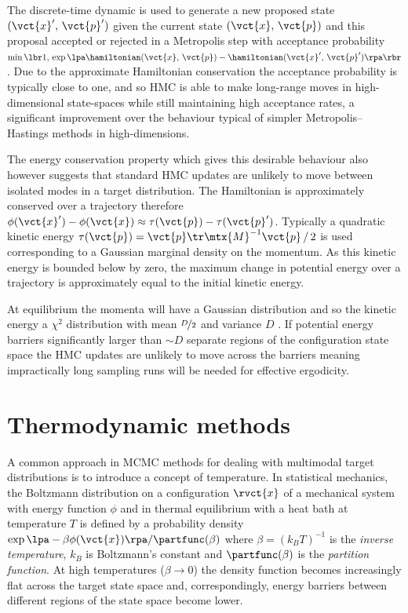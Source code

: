 The discrete-time dynamic is used to generate a new proposed state $(\vct{x}',\,\vct{p}')$ given the current state $(\vct{x},\,\vct{p})$ and this proposal accepted or rejected in a Metropolis step with acceptance probability $\min\lbr 1,\,\exp\lpa \hamiltonian(\vct{x},\,\vct{p})- \hamiltonian(\vct{x}',\,\vct{p}')\rpa\rbr$. Due to the approximate Hamiltonian conservation the acceptance probability is typically close to one, and so \ac{HMC} is able to make long-range moves in high-dimensional state-spaces while still maintaining high acceptance rates, a significant improvement over the behaviour typical of simpler Metropolis--Hastings methods in high-dimensions.

The energy conservation property which gives this desirable behaviour also however suggests that standard \ac{HMC} updates are unlikely to move between isolated modes in a target distribution. The Hamiltonian is approximately conserved over a trajectory therefore $\phi(\vct{x}') - \phi(\vct{x}) \approx \tau(\vct{p}) - \tau(\vct{p}')$. Typically a quadratic kinetic energy  $\tau(\vct{p}) = \vct{p}\tr\mtx{M}^{-1}\vct{p} \,/\,2$ is used corresponding to a Gaussian marginal density on the momentum. As this kinetic energy is bounded below by zero, the maximum change in potential energy over a trajectory is approximately equal to the initial kinetic energy. 

At equilibrium the momenta will have a Gaussian distribution and so the kinetic energy a $\chi^2$ distribution with mean $\nicefrac{D}{2}$ and variance $D$ \citep{neal2011mcmc,betancourt2013general}. If potential energy barriers significantly larger than $\sim D$ separate regions of the configuration state space the \ac{HMC} updates are unlikely to move across the barriers meaning impractically long sampling runs will be needed for effective ergodicity.

\section{Thermodynamic methods}

A common approach in \ac{MCMC} methods for dealing with multimodal target distributions is to introduce a concept of temperature. In statistical mechanics, the Boltzmann distribution on a configuration $\rvct{x}$ of a mechanical system with energy function $\phi$ and in thermal equilibrium with a heat bath at temperature $T$ is defined by a probability density $\exp\lpa-\beta\phi(\vct{x})\rpa / \partfunc(\beta)$ where $\beta = (k_B T)^{-1}$ is the \emph{inverse temperature}, $k_B$ is Boltzmann's constant and $\partfunc(\beta)$ is the \emph{partition function}. At high temperatures ($\beta \to 0$) the density function becomes increasingly flat across the target state space and, correspondingly, energy barriers between different regions of the state space become lower.

